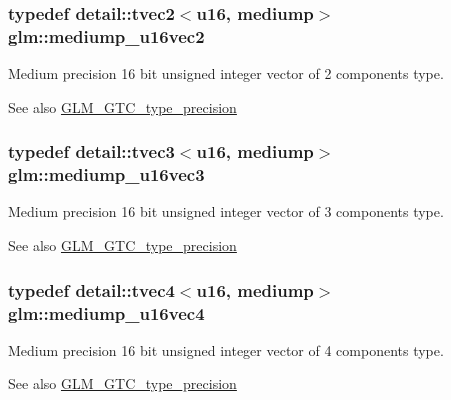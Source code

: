 \subsubsection[{\texorpdfstring{mediump\+\_\+u16vec2}{mediump_u16vec2}}]{\setlength{\rightskip}{0pt plus 5cm}typedef detail\+::tvec2$<$u16, mediump$>$ {\bf glm\+::mediump\+\_\+u16vec2}}\hypertarget{group__gtc__type__precision_ga93fe5ddc21391f0334eb3a60b76c390b}{}\label{group__gtc__type__precision_ga93fe5ddc21391f0334eb3a60b76c390b}
Medium precision 16 bit unsigned integer vector of 2 components type. \begin{DoxySeeAlso}{See also}
\hyperlink{group__gtc__type__precision}{G\+L\+M\+\_\+\+G\+T\+C\+\_\+type\+\_\+precision} 
\end{DoxySeeAlso}
\subsubsection[{\texorpdfstring{mediump\+\_\+u16vec3}{mediump_u16vec3}}]{\setlength{\rightskip}{0pt plus 5cm}typedef detail\+::tvec3$<$u16, mediump$>$ {\bf glm\+::mediump\+\_\+u16vec3}}\hypertarget{group__gtc__type__precision_ga82dbfd263ced8d03577008a3ef096598}{}\label{group__gtc__type__precision_ga82dbfd263ced8d03577008a3ef096598}
Medium precision 16 bit unsigned integer vector of 3 components type. \begin{DoxySeeAlso}{See also}
\hyperlink{group__gtc__type__precision}{G\+L\+M\+\_\+\+G\+T\+C\+\_\+type\+\_\+precision} 
\end{DoxySeeAlso}
\subsubsection[{\texorpdfstring{mediump\+\_\+u16vec4}{mediump_u16vec4}}]{\setlength{\rightskip}{0pt plus 5cm}typedef detail\+::tvec4$<$u16, mediump$>$ {\bf glm\+::mediump\+\_\+u16vec4}}\hypertarget{group__gtc__type__precision_gaad8b540f4231f69823c39fe9dfcb945a}{}\label{group__gtc__type__precision_gaad8b540f4231f69823c39fe9dfcb945a}
Medium precision 16 bit unsigned integer vector of 4 components type. \begin{DoxySeeAlso}{See also}
\hyperlink{group__gtc__type__precision}{G\+L\+M\+\_\+\+G\+T\+C\+\_\+type\+\_\+precision} 
\end{DoxySeeAlso}
